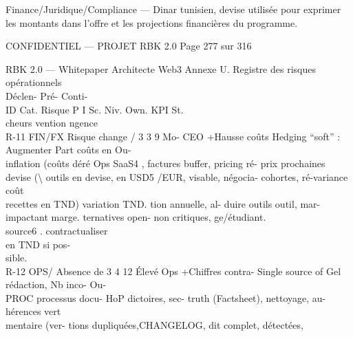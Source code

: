 Finance/Juridique/Compliance — Dinar tunisien, devise utilisée pour exprimer les montants dans l’offre et les projections financières du programme.\\
\vspace{0.5em}
\vspace{0.5em}
\begin{confidential}CONFIDENTIEL — PROJET RBK 2.0                                                                                              Page 277 sur 316\end{confidential}
RBK 2.0 — Whitepaper Architecte Web3                                                                                                                   Annexe U. Registre des risques opérationnels\\
\vspace{0.5em}
\vspace{0.5em}
Déclen-           Pré-               Conti-\\
ID         Cat.     Risque           P I Sc. Niv. Own.                                                               KPI            St.\\
cheurs            vention            ngence\\
R-11       FIN/FX   Risque change / 3 3 9      Mo- CEO      +Hausse     coûts Hedging “soft” : Augmenter             Part coûts en Ou-\\
inflation (coûts           déré Ops      SaaS4 , factures buffer, pricing ré- prix prochaines devise      (\textbackslash{}%
outils en devise,                        en USD5 /EUR, visable, négocia- cohortes,           ré-variance coût\\
recettes en TND)                         variation TND. tion annuelle, al- duire          outils outil,   mar-\\
impactant marge.                                          ternatives open- non        critiques, ge/étudiant.\\
source6 .           contractualiser\\
en TND si pos-\\
sible.\\
R-12       OPS/     Absence        de 3 4 12 Élevé Ops      +Chiffres contra- Single source of Gel       rédaction, Nb       inco- Ou-\\
PROC     processus docu-                HoP       dictoires,   sec- truth (Factsheet), nettoyage,    au- hérences      vert\\
mentaire     (ver-                       tions dupliquées,CHANGELOG, dit              complet, détectées,\\

